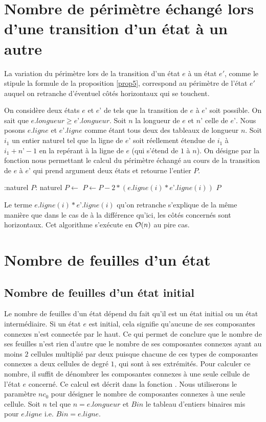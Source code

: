   \section{Nombre de périmètre échangé lors d'une transition d'un état à un autre}
  La variation  du périmètre lors de la transition d'un état $e$ à un état $e'$, comme le stipule la formule   de la proposition \ref{prop5}, correspond au périmètre de l'état $e'$ auquel on retranche d'éventuel côtés horizontaux  qui se touchent.
  
  On considère deux états $e$ et $e’$ de tels que la transition de $e$ à $e’$ soit possible. On sait que $e.longueur \geq e’.longueur $. Soit $n$ la longueur de $e$ et $n’$ celle de $e’$. Nous posons $e.ligne$ et $e’.ligne$ comme étant tous deux des tableaux de longueur $n$.  Soit $i_{1}$ un entier naturel tel que la ligne de $e’$  soit  réellement étendue de $i_{1}$ à  $i_{1}+n’-1$ en la repérant à la ligne de $e$ (qui s’étend de $1$ à $n$). On  désigne par   la fonction nous permettant le calcul du périmètre échangé au cours de la transition de $e$ à $e’$ qui prend argument deux états et  retourne l’entier $P$.

\begin{algorithmic}[1]
 :naturel
       \State $P$: naturel 
       \State $P\leftarrow$  
            \State $P\leftarrow P-2*\left( e.ligne(i)*e’.ligne(i)\right)$
        \EndFor
         \State \Return $P$
   \EndFunction
  \end{algorithmic}
 Le terme $ e.ligne(i)*e’.ligne(i)$ qu’on retranche  s’explique de la même manière que dans le cas de  à la différence qu’ici, les côtés concernés sont horizontaux.
Cet algorithme s’exécute en $\mathcal{O}(n)$ au pire cas.
\section{Nombre de feuilles d'un état}
\begin{spacing}{0.30}
\subsection{Nombre de feuilles d'un état initial}
\end{spacing}
Le nombre de feuilles d'un état dépend du fait qu'il est un état initial ou un état intermédiaire. Si un état $e$ est initial, cela signifie qu'aucune de ses composantes connexes n'est connectée par le haut. Ce qui permet de conclure que le nombre de ses feuilles n'est rien d'autre que le nombre de ses composantes connexes ayant au moins $2$ cellules  multiplié par deux puisque chacune de ces types de composantes connexes a deux cellules de degré $1$, qui sont à ses extrémités. Pour  calculer ce nombre, il suffit de dénombrer les composantes connexes à une seule cellule de l'état  $e$ concerné. Ce calcul est décrit dans la fonction .  Nous utiliserons le paramètre $nc_{0}$ pour désigner le nombre de composantes connexes à une seule cellule. Soit $n$ tel que $n=e.longueur$ et $Bin$ le tableau d'entiers binaires mis pour $e.ligne$ i.e. $Bin =e.ligne$.

